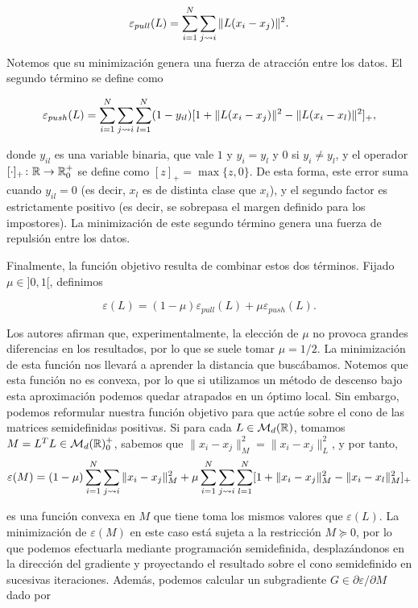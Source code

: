 \[ \varepsilon_{pull}(L) = \sum_{i=1}^N \sum_{j\rightsquigarrow i} \|L(x_i-x_j)\|^2. \]

Notemos que su minimización genera una fuerza de atracción entre los datos. El segundo término se define como

\[ \varepsilon_{push}(L) = \sum_{i=1}^{N}\sum_{j\rightsquigarrow i}\sum_{l=1}^{N} (1 - y_{il})[1 + \|L(x_i-x_j)\|^2 - \|L(x_i-x_l)\|^2]_{+}, \]

donde $y_{il}$ es una variable binaria, que vale $1$ y $y_i = y_l$ y $0$ si $y_i \ne y_l$, y el operador $[ \cdot ]_{+}\colon  \mathbb{R} \to \mathbb{R}^+_0$ se define como $[z]_{+} = \max\{z,0\}$. De esta forma, este error suma cuando $y_{il} = 0$ (es decir, $x_l$ es de distinta clase que $x_i$), y el segundo factor es estrictamente positivo (es decir, se sobrepasa el margen definido para los impostores). La minimización de este segundo término genera una fuerza de repulsión entre los datos.

Finalmente, la función objetivo resulta de combinar estos dos términos. Fijado $\mu \in ]0,1[$, definimos

\begin{equation} \label{eq:lmnn:L}
\varepsilon(L) = (1 - \mu)\varepsilon_{pull}(L) + \mu\varepsilon_{push}(L).
\end{equation}

Los autores afirman que, experimentalmente, la elección de $\mu$ no provoca grandes diferencias en los resultados, por lo que se suele tomar $\mu = 1/2$. La minimización de esta función nos llevará a aprender la distancia que buscábamos. Notemos que esta función no es convexa, por lo que si utilizamos un método de descenso bajo esta aproximación podemos quedar atrapados en un óptimo local. Sin embargo, podemos reformular nuestra función objetivo para que actúe sobre el cono de las matrices semidefinidas positivas. Si para cada $L \in \mathcal{M}_d(\mathbb{R})$, tomamos $M = L^TL \in \mathcal{M}_d(\mathbb{R})^+_0$, sabemos que $\|x_i-x_j\|_M^2 = \|x_i - x_j\|_L^2$, y por tanto,
\begin{equation} \label{eq:lmnn:M}
 \varepsilon(M) = (1-\mu) \sum_{i=1}^{N}\sum_{j\rightsquigarrow i} \|x_i - x_j\|_M^2 + \mu \sum_{i=1}^{N}\sum_{j\rightsquigarrow i}\sum_{l=1}^N [ 1 + \|x_i - x_j\|_M^2 - \|x_i - x_l\|_M^2]_{+}
\end{equation}

es una función convexa en $M$ que tiene toma los mismos valores que $\varepsilon(L)$. La minimización de $\varepsilon(M)$ en este caso está sujeta a la restricción $M \succeq 0$, por lo que podemos efectuarla mediante programación semidefinida, desplazándonos en la dirección del gradiente y proyectando el resultado sobre el cono semidefinido en sucesivas iteraciones. Además, podemos calcular un subgradiente $G \in \partial \varepsilon / \partial M$ dado por

